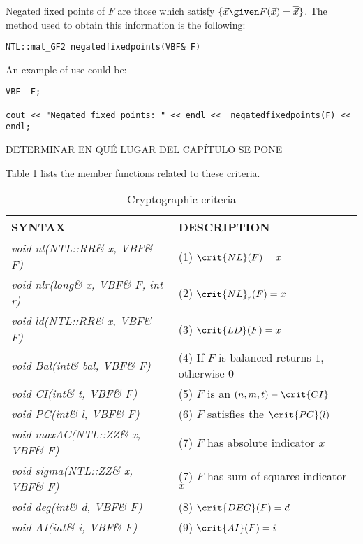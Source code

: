 Negated fixed points of $F$ are those which satisfy $\{ \vec{x} \given F(\vec{x})= \overline{\vec{x}} \}$. The method used to obtain this information is the following:

\begin{verbatim}
NTL::mat_GF2 negatedfixedpoints(VBF& F)
\end{verbatim}

An example of use could be:

\begin{verbatim}
VBF  F;

cout << "Negated fixed points: " << endl <<  negatedfixedpoints(F) << endl;
\end{verbatim}


\newpage

DETERMINAR EN QUÉ LUGAR DEL CAPÍTULO SE PONE


Table \ref{tab:Criteria} lists the member functions related to these criteria.

\begin{table}[htbp]%
\caption{Cryptographic criteria\label{tab:Criteria}}{
\begin{tabular}{|l|l|}
\hline
SYNTAX & DESCRIPTION\\\hline
\textsl{void nl(NTL::RR\& x, VBF\& F)} & (1) $\crit{NL}(F)=x$ \\\hline
\textsl{void nlr(long\& x, VBF\& F, int r)} & (2) $\crit{NL}_r(F)=x$ \\\hline
\textsl{void ld(NTL::RR\& x, VBF\& F)} & (3) $\crit{LD}(F)=x$ \\\hline
\textsl{void Bal(int\& bal, VBF\& F)} & (4) If $F$ is balanced returns $1$, otherwise $0$ \\\hline
\textsl{void CI(int\& t, VBF\& F)} & (5) $F$ is an $(n,m,t)-\crit{CI}$ \\\hline
\textsl{void PC(int\& l, VBF\& F)} & (6) $F$ satisfies the $\crit{PC}(l)$ \\\hline
\textsl{void maxAC(NTL::ZZ\& x, VBF\& F)} & (7) $F$ has absolute indicator $x$ \\\hline
\textsl{void sigma(NTL::ZZ\& x, VBF\& F)} & (7) $F$ has sum-of-squares indicator $x$ \\\hline
\textsl{void deg(int\& d, VBF\& F)} & (8) $\crit{DEG}(F)=d$ \\\hline
\textsl{void AI(int\& i, VBF\& F)} & (9) $\crit{AI}(F)=i$ \\\hline
\end{tabular}}
\end{table}%


